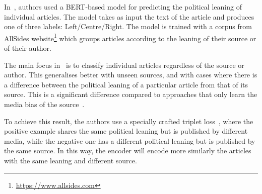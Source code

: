  

In~\citet{baly2020we}, authors used a BERT-based model for predicting the political leaning of individual articles. The model takes as input the text of the article and produces one of three labels: Left/Centre/Right. The model is trained with a corpus from AllSides website\footnote{\url{https://www.allsides.com}} which groups articles %
according to the leaning of their source or of their author.


The main focus in~\citet{baly2020we} is to classify individual articles regardless of the source or author. This generalises better with unseen sources, and with cases where there is a difference between the political leaning of a particular article from that of its source.
This is a significant difference compared to approaches that only learn the media bias of the source~\citep{baly2020written,biessmann2016automating}.

To achieve this result, the authors use a specially crafted triplet loss~\citep{schroff2015facenet}, where the positive example shares the same political leaning but is published by different media, while the negative one has a different political leaning but is published by the same source. In this way, the encoder will encode more similarly the articles with the same leaning and different source.


